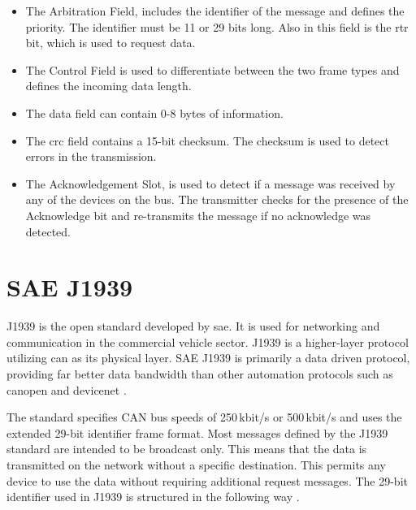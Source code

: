 \begin{itemize}
		\item The Arbitration Field, includes the identifier of the message and defines the priority. The identifier must be 11 or 29 bits long. Also in this field is the \acrfull{rtr} bit, which is used to request data.
		\item The Control Field is used to differentiate between the two frame types and defines the incoming data length.
		\item The data field can contain 0-8 bytes of information.
		\item The \acrshort{crc} field contains a 15-bit checksum. The checksum is used to detect errors in the transmission.
		\item The Acknowledgement Slot, is used to detect if a message was received by any of the devices on the bus. The transmitter checks for the presence of the Acknowledge bit and re-transmits the message if no acknowledge was detected.
\end{itemize}
\newpage

\section{SAE J1939}
J1939 is the open standard developed by \acrfull{sae}. It is used for networking and communication in the commercial vehicle sector. J1939 is a higher-layer protocol utilizing \acrshort{can} as its physical layer. SAE J1939 is primarily a data driven protocol, providing far better data bandwidth than other automation protocols such as \gls{canopen} and \gls{devicenet} \cite{introduction_sae_j1939_protocol}.

The standard specifies CAN bus speeds of 250\,kbit/s or 500\,kbit/s and uses the extended 29-bit identifier frame format. Most messages defined by the J1939 standard are intended to be broadcast only. This means that the data is transmitted on the network without a specific destination. This permits any device to use the data without requiring additional request messages. The 29-bit identifier used in J1939 is structured in the following way \cite{sae_j1939_introduction}. 


